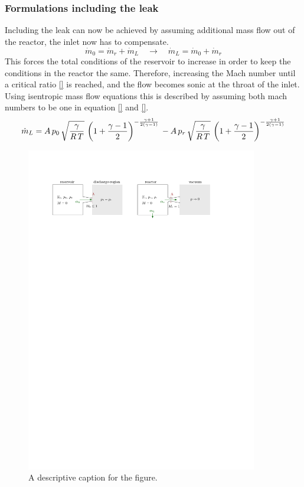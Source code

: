 \subsubsection*{Formulations including the leak}
	Including the leak can now be achieved by assuming additional mass flow out of the reactor, the inlet now has to compensate.
	$$
		\dot{m}_0 = \dot{m}_r + \dot{m}_L
		\quad \to \quad
		\dot{m}_L = \dot{m}_0 + \dot{m}_r
	$$
	This forces the total conditions of the reservoir to increase in order to keep the conditions in the reactor the same.
	Therefore, increasing the Mach number until a critical ratio \eqref{} is reached, and the flow becomes sonic at the throat of the inlet.
	Using isentropic mass flow equations this is described by assuming both mach numbers to be one in equation \eqref{} and \eqref{}.
	$$
		\dot{m}_L =
		A\, p_0\, \sqrt{\frac{\gamma}{R\,T}}\, \left(1+\frac{\gamma-1}{2}\right)^{-\frac{\gamma+1}{2(\gamma-1)}}\\\\
		- A\, p_r\, \sqrt{\frac{\gamma}{R\,T}}\,\left(1+\frac{\gamma-1}{2}\right)^{-\frac{\gamma+1}{2(\gamma-1)}}
	$$
	\begin{figure}[H]
	    \centering
	    \includegraphics[width=0.9\textwidth]{src/03_analytical-work/fig_disconnected-reservoirs-with-leak.pdf}
	    \caption{A descriptive caption for the figure.}
	    \label{fig:disconnected-reservoirs-leak}
	\end{figure}
